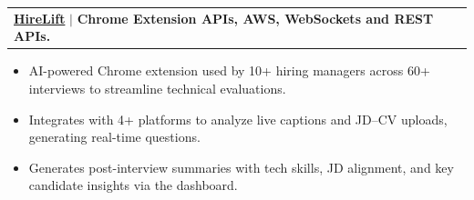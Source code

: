 \documentclass[letterpaper,10pt]{article}
\makeatletter
\newcommand{\resumeItem}[1]{\item[$\bullet$]\small{#1 \vspace{-2pt}}}
\newcommand{\resumeProjectHeading}[4]{
  \item
    \begin{tabular*}{0.97\textwidth}{l@{\extracolsep{\fill}}r}
      \small\textbf{\href{#2}{#1}} $|$  \textbf{#3} & \textit{#4} \\
    \end{tabular*}\vspace{-3pt}
}
\newcommand{\resumeItemListStart}{\begin{itemize}}
\newcommand{\resumeItemListEnd}{\end{itemize}\vspace{-5pt}}
\makeatother
\begin{document}
\resumeProjectHeading
  {HireLift}{https://chromewebstore.google.com/detail/hirelift/gchcmaknjamkfbcgbafcchcglpeagidi}{Chrome Extension APIs, AWS, WebSockets and REST APIs.}{}
    \resumeItemListStart
      \resumeItem{AI-powered Chrome extension used by 10+ hiring managers across 60+ interviews to streamline technical evaluations.}
      \resumeItem{Integrates with 4+ platforms to analyze live captions and JD–CV uploads, generating real-time questions.}
      \resumeItem{Generates post-interview summaries with tech skills, JD alignment, and key candidate insights via the dashboard.}
    \resumeItemListEnd

\end{document}
